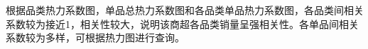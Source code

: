 \documentclass[withoutpreface,bwprint]{cumcmthesis}
\begin{document}
\begin{enumerate}

\end{enumerate}
根据品类热力系数图，单品总热力系数图和各品类单品热力系数图，各品类间相关系数较为接近1，相关性较大，说明该商超各品类销量呈强相关性。各单品间相关系数较为多样，可根据热力图进行查询。
\end{document}
